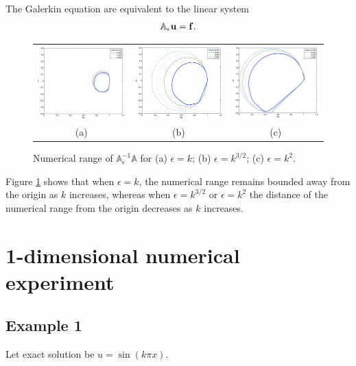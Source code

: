\documentclass[final,leqno]{siamltex704}
\begin{document}
The Galerkin equation are equivalent to the linear system
\begin{eqnarray}
\mathbb{A}_{\epsilon}{\bf u}={\bf f}.
\end{eqnarray}

\begin{figure}[H]
\centering
\begin{tabular}{ccc}
  {\includegraphics[width=.31\textwidth]{./Ref-fig/epsk}}&
  {\includegraphics[width=.31\textwidth]{./Ref-fig/epsk32}}&
  {\includegraphics[width=.31\textwidth]{./Ref-fig/eps2}}
  \\
  (a) & (b) & (c)
\end{tabular}
\caption{Numerical range of $\mathbb{A}_{\epsilon}^{-1}\mathbb{A}$ for (a) $\epsilon=k$; (b) $\epsilon=k^{3/2}$; (c) $\epsilon = k^2$.}\label{fig:ex_ref}
\end{figure}

Figure \ref{fig:ex_ref} shows that when $\epsilon = k$, the numerical range remains bounded away from the origin as $k$ increases, whereas when $\epsilon = k^{3/2}$ or $\epsilon=k^2$ the distance of the numerical range from the origin decreases as $k$ increases.

\section{1-dimensional numerical experiment}
\subsection{Example 1} Let exact solution be $u=\sin(k\pi x)$.
\end{document}
